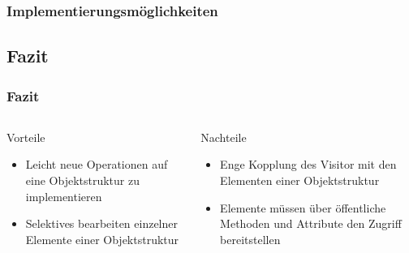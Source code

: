 \begin{frame}
	\frametitle{Implementierungsmöglichkeiten}

\end{frame}

\subsection{Fazit}
\begin{frame}
	\frametitle{Fazit}
	\begin{columns} 
    		\begin{exampleblock}{Vorteile}
    			\begin{itemize}
    				\item Leicht neue Operationen auf eine Objektstruktur zu implementieren
    				\item Selektives bearbeiten einzelner Elemente einer Objektstruktur
    			\end{itemize}
    		\end{exampleblock}
    		\begin{alertblock}{Nachteile}
    			\begin{itemize}
    				\item Enge Kopplung des Visitor mit den Elementen einer Objektstruktur
    				\item Elemente müssen über öffentliche Methoden und Attribute den Zugriff bereitstellen
    			\end{itemize}
    		\end{alertblock}
  	\end{columns}   	  		
\end{frame}